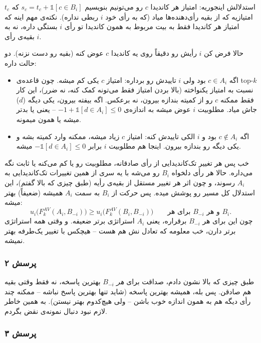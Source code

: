 \documentclass[12pt, a4paper]{article}
\begin{document}
استدلالش اینجوریه: امتیاز هر کاندیدا $c$ رو می‌تونیم بنویسیم $s_c = t_c + \mathbb{1}[c\in B_i]$ که $t_c$ امتیازیه که از بقیه رأی‌دهنده‌ها میاد (که به رأی خود $i$ ربطی نداره). نکته‌ی مهم اینه که امتیاز هر کاندیدا فقط به بیت مربوط به همون کاندیدا تو رأی $i$ بستگی داره، نه به بقیه‌ی رأی $i$.

حالا فرض کن $i$ رأیش رو دقیقاً روی یه کاندیدا $c$ عوض کنه (بقیه رو دست نزنه). دو حالت داره:
\begin{itemize}
\item اگه $c\in A_i$ بود ولی $i$ تاییدش رو برداره: امتیاز $c$ یکی کم میشه. چون قاعده‌ی top-$k$ نسبت به امتیاز یکنواخته (بالا بردن امتیاز فقط می‌تونه کمک کنه، نه ضرر)، این کار فقط ممکنه $c$ رو از کمیته بندازه بیرون، نه برعکس. اگه بیفته بیرون، یکی دیگه ($d$) جاش میاد. مطلوبیت $i$ عوض میشه به اندازه‌ی $-1 + \mathbb{1}[d\in A_i] \le 0$ -- یعنی یا بدتر میشه یا همون میمونه.
\item اگه $c\notin A_i$ بود و $i$ الکی تاییدش کنه: امتیاز $c$ زیاد میشه، ممکنه وارد کمیته بشه و یکی دیگه رو بندازه بیرون. اینجا هم مطلوبیت $i$ برابر $-\mathbb{1}[d\in A_i]\le 0$ میشه.
\end{itemize}

خب پس هر تغییر تک‌کاندیدایی از رأی صادقانه، مطلوبیت رو یا کم می‌کنه یا ثابت نگه می‌داره. حالا هر رأی دلخواه $B_i$ رو می‌شه با یه سری از همین تغییرات تک‌کاندیدایی به $A_i$ رسوند، و چون اثر هر تغییر مستقل از بقیه‌ی رأیه (طبق چیزی که بالا گفتم)، این استدلال کل مسیر رو پوشش میده. پس حرکت از $B_i$ به سمت $A_i$ همیشه (ضعیفاً) بهتر میشه:
\[
u_i\big(F_k^{AV}(A_i,B_{-i})\big) \ge u_i\big(F_k^{AV}(B_i,B_{-i})\big) \qquad \text{برای هر } B_{-i} \text{ و هر } B_i.
\]
چون این برای هر $B_{-i}$ برقراره، یعنی $A_i$ استراتژی برتر ضعیفه. و وقتی همه استراتژی برتر دارن، خب معلومه که تعادل نش هم هست -- هیچکس با تغییر یک‌طرفه بهتر نمیشه.

\subsubsection*{پرسش ۲}

طبق چیزی که بالا نشون دادم، صداقت برای \emph{هر} $B_{-i}$ بهترین پاسخه، نه فقط وقتی بقیه هم صادقن. پس بله، همیشه بهترین پاسخه (شاید تنها بهترین پاسخ نباشه -- ممکنه چند رأی دیگه هم به همون اندازه خوب باشن -- ولی هیچ‌کدوم بهتر نیستن). به همین خاطر لازم نبود دنبال نمونه‌ی نقض بگردم.

\subsubsection*{پرسش ۳}
\end{document}
